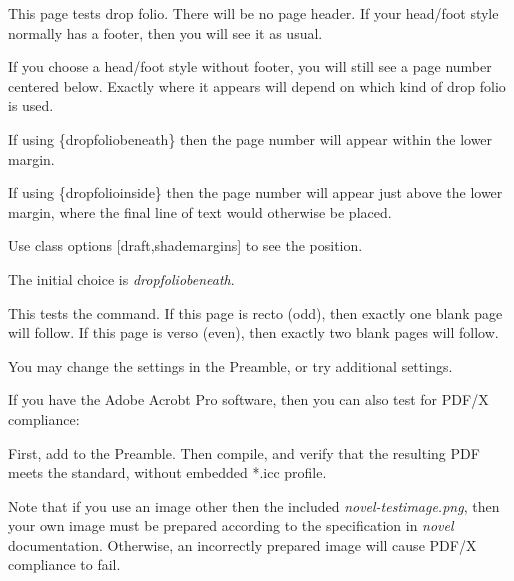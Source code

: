 \documentclass[test]{novel} %
\begin{document}
This page tests drop folio. There will be no page header. If your head/foot style normally has a footer, then you will see it as usual.

If you choose a head/foot style without footer, you will still see a page number centered below. Exactly where it appears will depend on which kind of drop folio is used.

If using \string\thispagestyle\{dropfoliobeneath\} then the page number will appear within the lower margin.

If using \string\thispagestyle\{dropfolioinside\} then the page number will appear just above the lower margin, where the final line of text would otherwise be placed. 

Use class options [draft,shademargins] to see the position.

The initial choice is \textit{dropfoliobeneath}.

\clearpage


This tests the \string\cleartoend\space command. If this page is recto (odd), then exactly one blank page will follow. If this page is verso (even), then exactly two blank pages will follow.

\null\null

You may change the settings in the Preamble, or try additional settings.

\null\null

If you have the Adobe Acrobt Pro software,  then you can also test for PDF/X compliance:

First, add  to the Preamble. Then compile, and verify that the resulting PDF meets the standard, without embedded *.icc profile.

Note that if you use an image other then the included \textit{novel-testimage.png}, then your own image must be prepared according to the specification in \textit{novel} documentation. Otherwise, an incorrectly prepared image will cause PDF/X compliance to fail.


\cleartoend %
\end{document}
